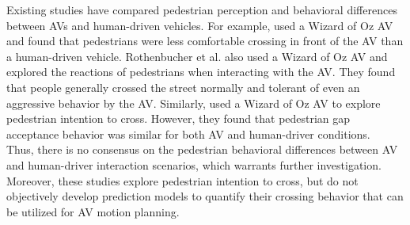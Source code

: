 \documentclass[letter,journal]{IEEEtran}
\begin{document}
Existing studies have compared pedestrian perception and behavioral differences between AVs and human-driven vehicles. For example, \cite{habibovic2018communicating} used a Wizard of Oz AV and found that pedestrians were less comfortable crossing in front of the AV than a human-driven vehicle. Rothenbucher et al. \cite{rothenbucher2016ghost} also used a Wizard of Oz AV and explored the reactions of pedestrians when interacting with the AV. They found that people generally crossed the street normally and tolerant of even an aggressive behavior by the AV. Similarly, \cite{palmeiro2018interaction} used a Wizard of Oz AV to explore pedestrian intention to cross. However, they found that pedestrian gap acceptance behavior was similar for both AV and human-driver conditions. \\

Thus, there is no consensus on the pedestrian behavioral differences between AV and human-driver interaction scenarios, which warrants further investigation. Moreover, these studies explore pedestrian intention to cross, but do not objectively develop prediction models to quantify their crossing behavior that can be utilized for AV motion planning. \\


%
\end{document}
